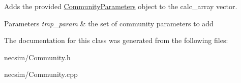 Adds the provided \hyperlink{struct_community_parameters}{Community\+Parameters} object to the calc\+\_\+array vector. 


\begin{DoxyParams}{Parameters}
{\em tmp\+\_\+param} & the set of community parameters to add \\
\hline
\end{DoxyParams}


The documentation for this class was generated from the following files\+:\begin{DoxyCompactItemize}
\item 
necsim/Community.\+h\item 
necsim/Community.\+cpp\end{DoxyCompactItemize}
